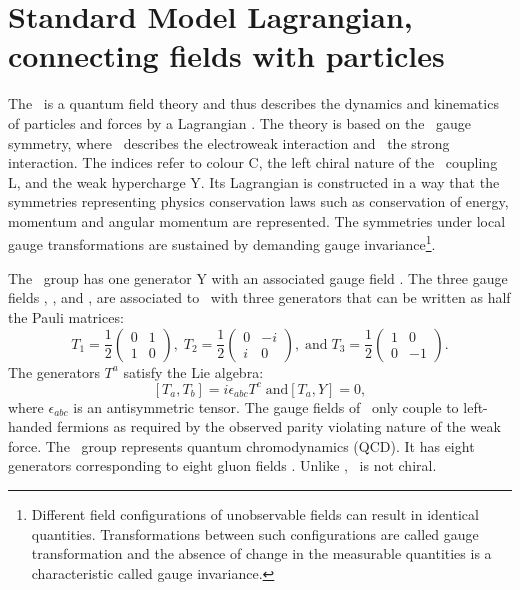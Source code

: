 \newpage
\section{Standard Model Lagrangian, connecting fields with particles}
\label{sec:SMlagr}
The \SM\ is a quantum field theory and thus describes the dynamics and kinematics of particles and forces by a Lagrangian \Lagr. The theory is based on the \SSU\ gauge symmetry, where \SU\ describes the electroweak interaction and \Sthree\ the strong interaction. The indices refer to colour C, the left chiral nature of the \Stwo\ coupling L, and the weak hypercharge Y. Its Lagrangian is constructed in a way that the symmetries representing physics conservation laws such as conservation of energy, momentum and angular momentum are represented. The symmetries under local gauge transformations are sustained by demanding gauge invariance\footnote{Different field configurations of unobservable fields can result in identical quantities. Transformations between such configurations are called gauge transformation and the absence of change in the measurable quantities is a characteristic called gauge invariance.}.  



The \Uone\ group has one generator Y with an associated gauge field \Bfield. The three gauge fields \Wfieldone, \Wfieldtwo, and \Wfieldthree, are associated to \Stwo\ with three generators that can  be written as half the Pauli matrices: 
\begin{equation}
T_1 =  \frac{1}{2}
\begin{pmatrix}
0  &  1      \\
1  & 0      
\end{pmatrix}, \;
T_2= \frac{1}{2}
\begin{pmatrix}
0  &  -i     \\
i  &  0      
\end{pmatrix},\;\mathrm{ and } \;
 T_3= \frac{1}{2}
 \begin{pmatrix}
 1  &  0     \\
 0  &  -1 
 \end{pmatrix}.
 \label{eq:Stwee}
\end{equation}
The generators $T^a$ satisfy the Lie algebra: 
\begin{equation}
 \left[T_a,T_b\right] = i \epsilon_{abc} T^c \; \mathrm{ and } \left[T_a, Y\right] = 0, 
\end{equation}
where $\epsilon_{abc}$ is an antisymmetric tensor. The gauge fields of \Stwo\ only couple to left-handed fermions as required by the observed parity violating nature of the weak force. The \Sthree\ group represents quantum chromodynamics (QCD). It  has eight generators corresponding to eight gluon fields \Gfields. Unlike \SU, \Sthree\ is not chiral. 

